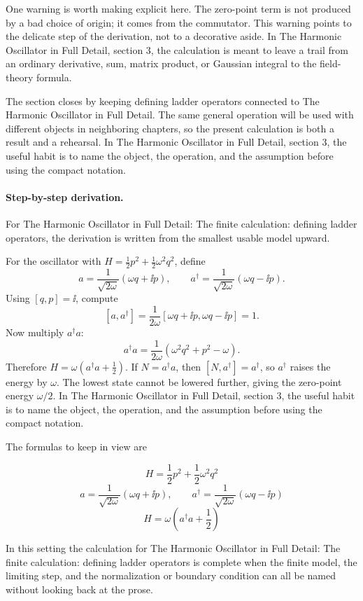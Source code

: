 One warning is worth making explicit here.  The zero-point term is not produced by a bad choice of origin; it comes from the commutator.  This warning points to the delicate step of the derivation, not to a decorative aside.  In The Harmonic Oscillator in Full Detail, section 3, the calculation is meant to leave a trail from an ordinary derivative, sum, matrix product, or Gaussian integral to the field-theory formula.

The section closes by keeping defining ladder operators connected to The Harmonic Oscillator in Full Detail.  The same general operation will be used with different objects in neighboring chapters, so the present calculation is both a result and a rehearsal.  In The Harmonic Oscillator in Full Detail, section 3, the useful habit is to name the object, the operation, and the assumption before using the compact notation.



\paragraph{Step-by-step derivation.}

For The Harmonic Oscillator in Full Detail: The finite calculation: defining ladder operators, the derivation is written from the smallest usable model upward.

For the oscillator with \(H=\frac12p^2+\frac12\omega^2q^2\), define
\[
  a=\frac{1}{\sqrt{2\omega}}(\omega q+\ii p),\qquad
  a^\dagger=\frac{1}{\sqrt{2\omega}}(\omega q-\ii p).
\]
Using \([q,p]=\ii\), compute
\[
  [a,a^\dagger]
  =
  \frac{1}{2\omega}[\omega q+\ii p,\omega q-\ii p]=1.
\]
Now multiply \(a^\dagger a\):
\[
  a^\dagger a=\frac{1}{2\omega}(\omega^2q^2+p^2-\omega).
\]
Therefore \(H=\omega(a^\dagger a+\frac12)\).  If \(N=a^\dagger a\), then \([N,a^\dagger]=a^\dagger\), so \(a^\dagger\) raises the energy by \(\omega\).  The lowest state cannot be lowered further, giving the zero-point energy \(\omega/2\).  In The Harmonic Oscillator in Full Detail, section 3, the useful habit is to name the object, the operation, and the assumption before using the compact notation.

The formulas to keep in view are

\[
  H=\frac12p^2+\frac12\omega^2q^2
\]
\[
  a=\frac{1}{\sqrt{2\omega}}(\omega q+\ii p),\qquad a^\dagger=\frac{1}{\sqrt{2\omega}}(\omega q-\ii p)
\]
\[
  H=\omega\left(a^\dagger a+\frac12\right)
\]

In this setting the calculation for The Harmonic Oscillator in Full Detail: The finite calculation: defining ladder operators is complete when the finite model, the limiting step, and the normalization or boundary condition can all be named without looking back at the prose.




